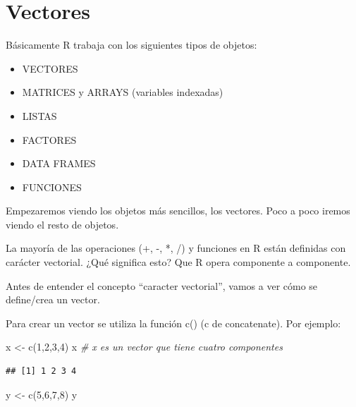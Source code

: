 \documentclass[
]{book}
\newenvironment{Shaded}{\begin{snugshade}}{\end{snugshade}}
\newcommand{\CommentTok}[1]{\textcolor[rgb]{0.56,0.35,0.01}{\textit{#1}}}
\newcommand{\DecValTok}[1]{\textcolor[rgb]{0.00,0.00,0.81}{#1}}
\newcommand{\FunctionTok}[1]{\textcolor[rgb]{0.00,0.00,0.00}{#1}}
\newcommand{\NormalTok}[1]{#1}
\newcommand{\OtherTok}[1]{\textcolor[rgb]{0.56,0.35,0.01}{#1}}
\begin{document}
\hypertarget{vectores}{%
\section{Vectores}\label{vectores}}

Básicamente R trabaja con los siguientes tipos de objetos:

\begin{itemize}
\item
  VECTORES
\item
  MATRICES y ARRAYS (variables indexadas)
\item
  LISTAS
\item
  FACTORES
\item
  DATA FRAMES
\item
  FUNCIONES
\end{itemize}

Empezaremos viendo los objetos más sencillos, los vectores. Poco a poco iremos viendo el resto de objetos.

La mayoría de las operaciones (+, -, *, /) y funciones en R están definidas con carácter vectorial. ¿Qué significa esto? Que R opera componente a componente.

Antes de entender el concepto ``caracter vectorial'', vamos a ver cómo se define/crea un vector.

Para crear un vector se utiliza la función c() (c de concatenate). Por ejemplo:

\begin{Shaded}
\begin{Highlighting}[]
\NormalTok{x }\OtherTok{\textless{}{-}} \FunctionTok{c}\NormalTok{(}\DecValTok{1}\NormalTok{,}\DecValTok{2}\NormalTok{,}\DecValTok{3}\NormalTok{,}\DecValTok{4}\NormalTok{)}
\NormalTok{x                  }\CommentTok{\# x es un vector que tiene cuatro componentes}
\end{Highlighting}
\end{Shaded}

\begin{verbatim}
## [1] 1 2 3 4
\end{verbatim}

\begin{Shaded}
\begin{Highlighting}[]
\NormalTok{y }\OtherTok{\textless{}{-}} \FunctionTok{c}\NormalTok{(}\DecValTok{5}\NormalTok{,}\DecValTok{6}\NormalTok{,}\DecValTok{7}\NormalTok{,}\DecValTok{8}\NormalTok{)}
\NormalTok{y}
\end{Highlighting}
\end{Shaded}
\end{document}
